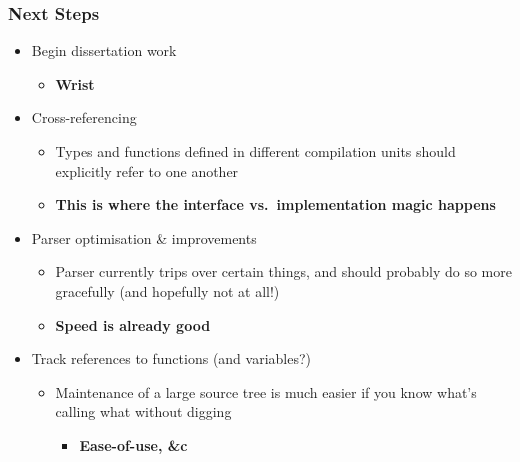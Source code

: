 \documentclass[handout]{beamer}
\begin{document}
  \begin{frame}
    \frametitle{Next Steps}
      \begin{itemize}
        \item Begin dissertation work
          \begin{itemize}
            \item \textbf{Wrist}
          \end{itemize}
        \item Cross-referencing
          \begin{itemize}
            \item Types and functions defined in different compilation units
              should explicitly refer to one another
            \item \textbf{This is where the interface vs.~implementation magic
              happens}
          \end{itemize}
        \item Parser optimisation \& improvements
          \begin{itemize}
            \item Parser currently trips over certain things, and should
              probably do so more gracefully (and hopefully not at all!)
            \item \textbf{Speed is already good}
          \end{itemize}
        \item Track references to functions (and variables?)
          \begin{itemize}
            \item Maintenance of a large source tree is much easier if you know
              what's calling what without digging
              \begin{itemize}
                \item \textbf{Ease-of-use, \&c}
              \end{itemize}
          \end{itemize}
      \end{itemize}
  \end{frame}
\end{document}
